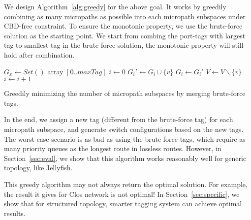  We design Algorithm~\ref{alg:greedy} for the above goal.
It works by greedily combining as many micropaths as possible into each micropath subspaces under CBD-free constraint.
To ensure the monotonic property, we use the brute-force solution as the starting point. We start from combing the port-tags 
with largest tag to smallest tag in the brute-force solution,
the monotonic property will still hold after combination. 


\begin{algorithm}
	$G_x \gets Set()$ array $[0..maxTag]$\; 
	$i \gets 0$\;
	 {
		 {
			$G_i' \gets G_i \cup \{v\}$ \;
			 {
				$G_i \gets G_i'$ \; 
			}
			$V \gets V \backslash \{v\}$ \;
		}
		 {
			$i \gets i+1$\;
		}
	}
	\;
    \caption{Greedily minimizing the number of micropath subspaces by merging brute-force tags.}
	\label{alg:greedy}
\end{algorithm}

In the end, we assign a new tag (different from the brute-force tag) for each micropath subspace, and generate switch configurations
based on the new tags. The worst case scenario is as bad as using the brute-force tags, which require
as many priority queues as the longest route in lossless routes. However,
in Section~\ref{sec:eval}, we show that this algorithm works reasonably well for generic topology, like Jellyfish. 

This greedy algorithm may not always return the optimal solution. For example, the result it gives for Clos network is not 
optimal! In Section~\ref{sec:specific}, we show that for structured topology, smarter tagging system can achieve optimal results.